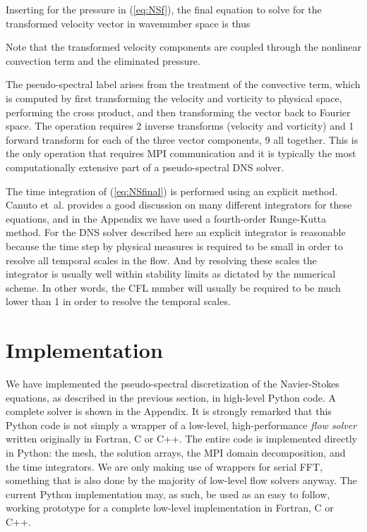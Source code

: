\documentclass[final,3p,times,twocolumn]{elsarticle}
\begin{document}
Inserting for the pressure in (\ref{eq:NSf}), the final equation to solve for the transformed velocity vector in wavenumber space is thus

Note that the transformed velocity components are coupled through the nonlinear convection term and the eliminated pressure.

The pseudo-spectral label arises from the treatment of the convective term, which is computed by first transforming the velocity and vorticity to physical space, performing the cross product, and then transforming the vector   back to Fourier space. The operation requires 2 inverse transforms (velocity and vorticity) and 1 forward transform for each of the three vector components, 9 all together. This is the only operation that requires MPI communication and it is typically the most computationally extensive part of a pseudo-spectral DNS solver.

The time integration of (\ref{eq:NSfinal}) is performed using an explicit method. Canuto et~al. \cite{canuto1988} provides a good discussion on many different integrators for these equations, and in the Appendix we have used a fourth-order Runge-Kutta method. For the DNS solver described here an explicit integrator is reasonable because the time step by physical measures is required to be small in order to resolve all temporal scales in the flow. And by resolving these scales the integrator is usually well within stability limits as dictated by the numerical scheme. In other words, the CFL number will usually be required to be much lower than 1 in order to resolve the temporal scales.

\section{Implementation}

We have implemented the pseudo-spectral discretization of the Navier-Stokes equations, as described in the previous section, in high-level Python code. A complete solver is shown in the Appendix. It is strongly remarked that this Python code is not simply a wrapper of a low-level, high-performance \emph{flow solver} written originally in Fortran, C or C++. The entire code is implemented directly in Python: the mesh, the solution arrays, the MPI domain decomposition, and the time integrators. We are only making use of wrappers for serial FFT, something that is also done by the majority of low-level flow solvers anyway. The current Python implementation may, as such, be used as an easy to follow, working prototype for a complete low-level implementation in Fortran, C or C++.
\end{document}
